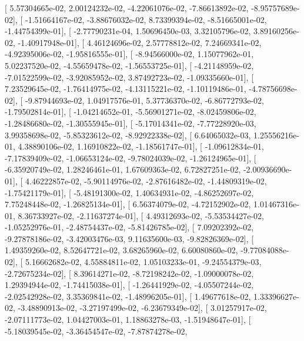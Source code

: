 \documentclass{article}
\begin{document}
       [  5.57304665e-02,   2.00124232e-02,  -4.22061076e-02,
         -7.86613892e-02,  -8.95757689e-02],
       [ -1.51664167e-02,  -3.88676032e-02,   8.73399394e-02,
         -8.51665001e-02,  -1.44754399e-01],
       [ -2.77790231e-04,   1.50696450e-03,   3.32105796e-02,
          3.89160256e-02,  -1.40917948e-01],
       [  4.46124696e-02,   2.57778812e-02,   7.24669341e-02,
         -4.92395006e-02,  -1.95816555e-01],
       [ -8.94566000e-02,   1.15077962e-01,   5.02237520e-02,
         -4.55659478e-02,  -1.56553725e-01],
       [ -4.21148959e-02,  -7.01522599e-02,  -3.92085952e-02,
          3.87492723e-02,  -1.09335660e-01],
       [  7.23529645e-02,  -1.76414975e-02,  -4.13115221e-02,
         -1.10119486e-01,  -4.78756698e-02],
       [ -9.87944693e-02,   1.04917576e-01,   5.37736370e-02,
         -6.86772793e-02,  -1.79502814e-01],
       [ -1.04214652e-01,  -5.56901271e-02,  -8.02459806e-02,
         -1.28486680e-02,  -1.30555945e-01],
       [ -5.17014341e-02,  -7.77228920e-03,   3.99358698e-02,
         -5.85323612e-02,  -8.92922338e-02],
       [  6.64065032e-03,   1.25556216e-01,   4.38890106e-02,
          1.16910822e-02,  -1.18561747e-01],
       [ -1.09612834e-01,  -7.17839409e-02,  -1.06653124e-02,
         -9.78024039e-02,  -1.26124965e-01],
       [ -6.35920749e-02,   1.28246461e-01,   1.67609363e-02,
          6.72827251e-02,  -2.00936690e-01],
       [  4.46222857e-02,  -5.90114976e-02,  -2.87616482e-02,
         -1.44809319e-02,  -1.75421179e-01],
       [ -5.48191300e-02,   1.40634931e-02,  -4.86252697e-02,
          7.75248448e-02,  -1.26825134e-01],
       [  6.56374079e-02,  -4.72152902e-02,   1.01467316e-01,
          8.36733927e-02,  -2.11637274e-01],
       [  4.49312693e-02,  -5.53534427e-02,  -1.05252976e-01,
         -2.48754437e-02,  -5.81426785e-02],
       [  7.09202392e-02,  -9.27878186e-02,  -3.42003476e-03,
          9.11635600e-03,  -9.82826369e-02],
       [  1.49359260e-02,   8.52647721e-02,   3.68265960e-02,
          6.60080860e-02,  -9.77084088e-02],
       [  5.16662682e-02,   4.55884811e-02,   1.05103233e-01,
         -9.24554379e-03,  -2.72675234e-02],
       [  8.39614271e-02,  -8.72198242e-02,  -1.09000078e-02,
          1.29394944e-02,  -1.74415038e-01],
       [ -1.26441929e-02,  -4.05507244e-02,  -2.02542928e-02,
          3.35369841e-02,  -1.48996205e-01],
       [  1.49677618e-02,   1.33396627e-02,  -3.48890913e-02,
         -3.27197499e-02,  -6.23679349e-02],
       [  3.01257917e-02,  -2.07111773e-02,   1.04427003e-01,
          1.18863278e-03,  -1.51948647e-01],
       [ -5.18039545e-02,  -3.36454547e-02,  -7.87874278e-02,
\end{document}
